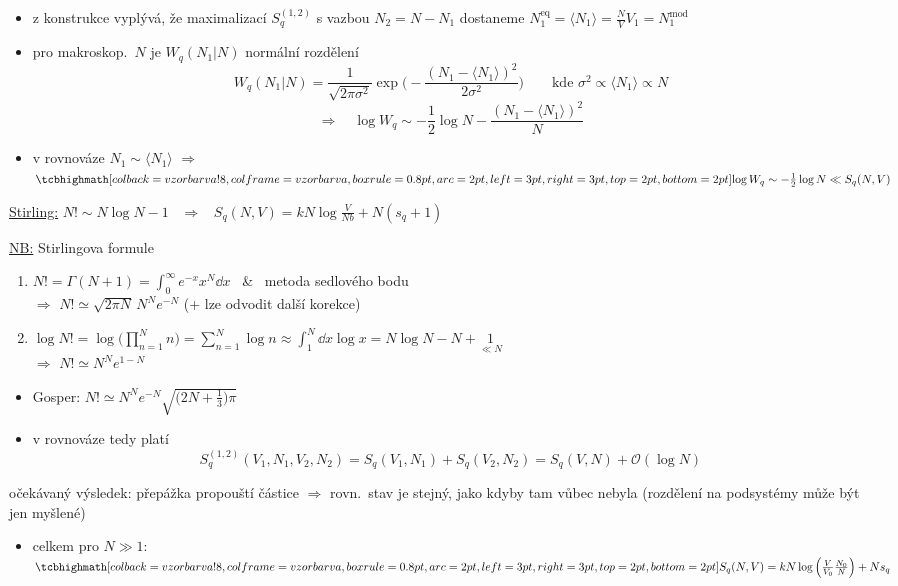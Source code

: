 \begin{itemize}
  \item z konstrukce vyplývá, že maximalizací $S_q^{(1,2)}$ s vazbou $N_2 = N - N_1$ dostaneme $N_1^{\mathrm{eq}} = \langle N_1\rangle = \frac{N}{V}V_1 = N_1^{\mathrm{mod}}$ 
  \item pro makroskop.\ $N$ je $W_q(N_1|N)$ normální rozdělení
  \[
    W_q(N_1|N) = \frac{1}{\sqrt{2\pi\sigma^2}}\exp\Big(-\frac{(N_1 - \langle N_1\rangle)^2}{2\sigma^2}\Big) \qquad\text{kde } \sigma^2\propto\langle N_1\rangle\propto N
  \]
  \[
    \Rightarrow\quad \log W_q \sim -\frac12\log N - \frac{(N_1 - \langle N_1\rangle)^2}{N}
  \]
  \item v rovnováze $N_1\sim\langle N_1\rangle$ \quad $\Rightarrow$ \quad $\vzorec{\log W_q \sim -\frac12\log N \ll S_q(N,V)}$
\end{itemize}

{\color{NavyBlue}
\underline{Stirling:} $N!\sim N\log N - 1$ \ $\Rightarrow$ \ $S_q(N,V) = kN\log\frac{V}{Nb} + N(s_q + 1)$

\underline{NB:} Stirlingova formule
\begin{enumerate}[label=\alph*)]
  \item $N! = \Gamma(N+1) = \int_0^\infty e^{-x}x^N\dd x$ \ \& \ metoda sedlového bodu \\
        $\Rightarrow$ $N! \simeq \sqrt{2\pi N}\,N^Ne^{-N}$ \quad (+ lze odvodit další korekce)
  \item $\log N! = \log\Big(\prod_{n=1}^{N}n\Big) = \sum_{n=1}^{N}\log n \approx \int_1^N\dd x\log x = N\log N - N + \underset{\ll N}{1}$ \\
        $\Rightarrow$ $N! \simeq N^Ne^{1-N}$
\end{enumerate}
\begin{itemize}
  \item Gosper: \quad $N! \simeq N^Ne^{-N}\sqrt{\big(2N + \frac13\big)\pi}$
\end{itemize}
}

\begin{itemize}
  \item v rovnováze tedy platí
  \[
    S_q^{(1,2)}(V_1,N_1,V_2,N_2) = S_q(V_1,N_1) + S_q(V_2,N_2) = S_q(V,N) + \mathcal O(\log N)
  \]
\end{itemize}
\pozor{!} očekávaný výsledek: přepážka propouští částice $\Rightarrow$ rovn.\ stav je stejný, jako kdyby tam vůbec nebyla (rozdělení na podsystémy může být jen myšlené)
\begin{itemize}
  \item celkem pro $N\gg 1$: \quad
  $\vzorec{S_q(N,V) = kN\log\Big(\frac{V}{V_0}\frac{N_0}{N}\Big) + Ns_q}$
\end{itemize}

